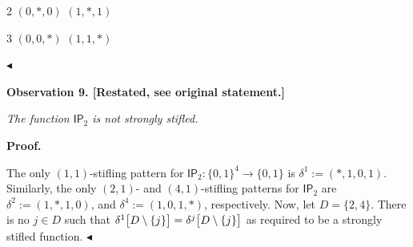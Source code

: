 2
$(0,*,0)$
$(1,*,1)$


3
$(0,0,*)$
$(1,1,*)$









$\blacktriangleleft$\par






\par\medskip\noindent\textbf{
\textbf{Observation 9}\textbf{.}
[Restated, see original statement.]}\par



\emph{The function $\mathsf{IP}_{2}$ is not strongly stifled.}\par








\par\medskip\noindent\textbf{Proof.}\par




The only $(1,1)$-stifling pattern for $\mathsf{IP}_{2}:\{0,1\}^{4}\to\{0,1\}$ is $\delta^{1}:=(*,1,0,1)$.
Similarly, the only $(2,1)$- and $(4,1)$-stifling patterns for $\mathsf{IP}_{2}$ are $\delta^{2}:=(1,*,1,0)$, and $\delta^{4}:=(1,0,1,*)$, respectively.
Now, let $D=\{2,4\}$.
There is no $j\in D$ such that $\delta^{1}\bigl{[}D\setminus\{j\}\bigr{]}=\delta^{j}\bigl{[}D\setminus\{j\}%
\bigr{]}$ as required to be a strongly stifled function.
$\blacktriangleleft$\par




\par



